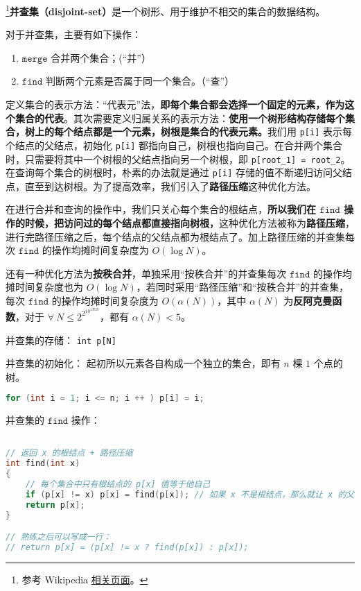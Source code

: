
\footnote{参考 Wikipedia \href{https://en.wikipedia.org/wiki/Disjoint-set_data_structure}{相关页面}。}\textbf{并查集（disjoint-set）}是一个树形、用于维护不相交的集合的数据结构。

对于并查集，主要有如下操作：
\begin{enumerate}
\item $\mathtt{merge}$ 合并两个集合；(“并”）

\item $\mathtt{find}$ 判断两个元素是否属于同一个集合。（“查”）
\end{enumerate}

定义集合的表示方法：“代表元”法，\textbf{即每个集合都会选择一个固定的元素，作为这个集合的代表}。其次需要定义归属关系的表示方法：\textbf{使用一个树形结构存储每个集合，树上的每个结点都是一个元素，树根是集合的代表元素。}我们用 \verb`p[i]` 表示每个结点的父结点，初始化 \verb`p[i]` 都指向自己，树根也指向自己。在合并两个集合时，只需要将其中一个树根的父结点指向另一个树根，即 \verb`p[root_1] = root_2`。在查询每个集合的树根时，朴素的办法就是通过 \verb`p[i]` 存储的值不断递归访问父结点，直至到达树根。为了提高效率，我们引入了\textbf{路径压缩}这种优化方法。

在进行合并和查询的操作中，我们只关心每个集合的根结点，\textbf{所以我们在 $\mathtt{find}$ 操作的时候，把访问过的每个结点都直接指向树根，}这种优化方法被称为\textbf{路径压缩}，进行完路径压缩之后，每个结点的父结点都为根结点了。加上路径压缩的并查集每次 $\mathtt{find}$ 的操作均摊时间复杂度为 $O(\log N)$。

还有一种优化方法为\textbf{按秩合并}，单独采用“按秩合并”的并查集每次 $\mathtt{find}$ 的操作均摊时间复杂度也为 $O(\log N)$，若同时采用“路径压缩”和“按秩合并”的并查集，每次 $\mathtt{find}$ 的操作均摊时间复杂度为 $O(\alpha(N))$，其中 $\alpha(N)$ 为\textbf{反阿克曼函数}，对于 $\forall \ N \leq 2^{2^{10^{19729}}}$，都有 $\alpha(N) < 5$。

并查集的存储：
\verb`int p[N]`

并查集的初始化：
起初所以元素各自构成一个独立的集合，即有 $n$ 棵 $1$ 个点的树。
\begin{lstlisting}[language=cpp]
for (int i = 1; i <= n; i ++ ) p[i] = i;
\end{lstlisting}

并查集的 $\mathtt{find}$ 操作：
\begin{lstlisting}[language=cpp]

// 返回 x 的根结点 + 路径压缩
int find(int x)
{
    // 每个集合中只有根结点的 p[x] 值等于他自己
    if (p[x] != x) p[x] = find(p[x]); // 如果 x 不是根结点，那么就让 x 的父结点直接等于根结点
    return p[x];
}

// 熟练之后可以写成一行：
// return p[x] = (p[x] != x ? find(p[x]) : p[x]);
\end{lstlisting}

